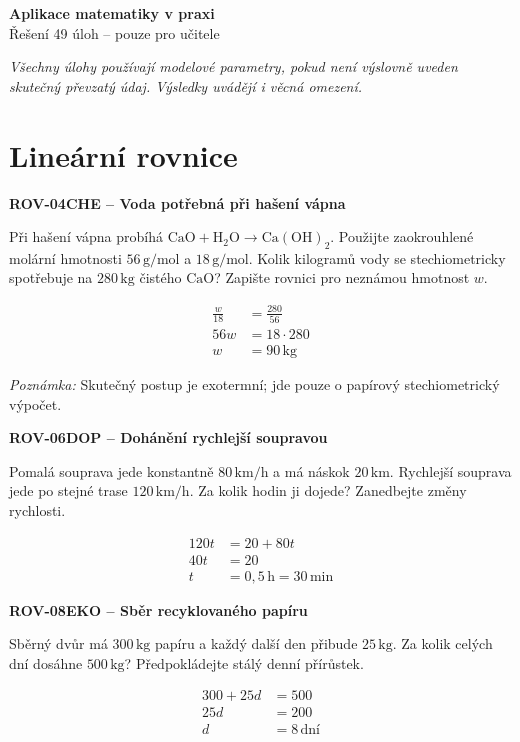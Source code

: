 \documentclass[11pt,a4paper]{article}
\begin{document}
\begin{center}{\LARGE\bfseries Aplikace matematiky v praxi}\\[2mm]{\large Řešení 49 úloh -- pouze pro učitele}\end{center}
\textit{Všechny úlohy používají modelové parametry, pokud není výslovně uveden skutečný převzatý údaj. Výsledky uvádějí i věcná omezení.}

\section{Lineární rovnice}
\par\medskip\noindent
\textbf{ROV-04}\quad\textbf{CHE -- Voda potřebná při hašení vápna}\par
Při hašení vápna probíhá $\mathrm{CaO+H_2O\rightarrow Ca(OH)_2}$. Použijte zaokrouhlené molární hmotnosti $56\,\mathrm{g/mol}$ a $18\,\mathrm{g/mol}$. Kolik kilogramů vody se stechiometricky spotřebuje na $280\,\mathrm{kg}$ čistého $\mathrm{CaO}$? Zapište rovnici pro neznámou hmotnost $w$.
\par\[\begin{aligned}
\frac{w}{18}&=\frac{280}{56}\\56w&=18\cdot280\\w&=90\,\mathrm{kg}
\end{aligned}\]
\par\textit{Poznámka:} Skutečný postup je exotermní; jde pouze o papírový stechiometrický výpočet.
\par\medskip\noindent
\textbf{ROV-06}\quad\textbf{DOP -- Dohánění rychlejší soupravou}\par
Pomalá souprava jede konstantně $80\,\mathrm{km/h}$ a má náskok $20\,\mathrm{km}$. Rychlejší souprava jede po stejné trase $120\,\mathrm{km/h}$. Za kolik hodin ji dojede? Zanedbejte změny rychlosti.
\par\[\begin{aligned}
120t&=20+80t\\40t&=20\\t&=0{,}5\,\mathrm h=30\,\mathrm{min}
\end{aligned}\]
\par\medskip\noindent
\textbf{ROV-08}\quad\textbf{EKO -- Sběr recyklovaného papíru}\par
Sběrný dvůr má $300\,\mathrm{kg}$ papíru a každý další den přibude $25\,\mathrm{kg}$. Za kolik celých dní dosáhne $500\,\mathrm{kg}$? Předpokládejte stálý denní přírůstek.
\par\[\begin{aligned}
300+25d&=500\\25d&=200\\d&=8\,\text{dní}
\end{aligned}\]
\end{document}
